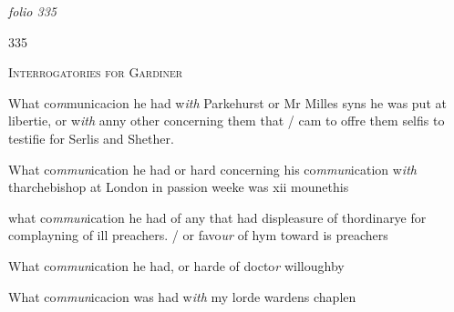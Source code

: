 \documentclass[12pt, a4paper]{book}
\begin{document}
\textit{folio 335}



\begin{flushright}{\color{Mahogany}335}\end{flushright}

				\begin{center} \begin{large} {\scshape Interrogatories for Gardiner} \end{large} \end{center}
			

            		
				\marginpar[\vspace{0.5cm}{\textcolor{Gray}{1}}]{}
			 
		\ifthenelse{\isodd{\thepage}}
		{\reversemarginpar}
		{\normalmarginpar}
		What co\textit{m}municacion he had w\textit{ith }Parkehurst or Mr Milles syns he
was put at libertie, or w\textit{ith} anny other concerning them that / cam to offre
them selfis to testifie for Serlis and Shether.

            		
				\marginpar[\vspace{0.5cm}{\textcolor{Gray}{2}}]{}
			 
		\ifthenelse{\isodd{\thepage}}
		{\reversemarginpar}
		{\normalmarginpar}
		What co\textit{mmun}ication he had or hard concerning his co\textit{mmun}ication w\textit{ith }tharchebishop 
at London in passion weeke was xii mounethis

            		
				\marginpar[\vspace{0.5cm}{\textcolor{Gray}{3}}]{}
			
		\ifthenelse{\isodd{\thepage}}
		{\reversemarginpar}
		{\normalmarginpar}
		what co\textit{mmun}ication he had of any that had displeasure of thordinarye
for complayning of ill preachers. / or favo\textit{ur} of hym toward is preachers

            		
				\marginpar[\vspace{0.5cm}{\textcolor{Gray}{4}}]{}
			 
		\ifthenelse{\isodd{\thepage}}
		{\reversemarginpar}
		{\normalmarginpar}
		What co\textit{mmun}ication he had, or harde of docto\textit{r} willoughby

            		
				\marginpar[\vspace{0.5cm}{\textcolor{Gray}{5}}]{}
			
		\ifthenelse{\isodd{\thepage}}
		{\reversemarginpar}
		{\normalmarginpar}
		What co\textit{mmun}icacion was had w\textit{ith} my lorde wardens chaplen
\end{document}
